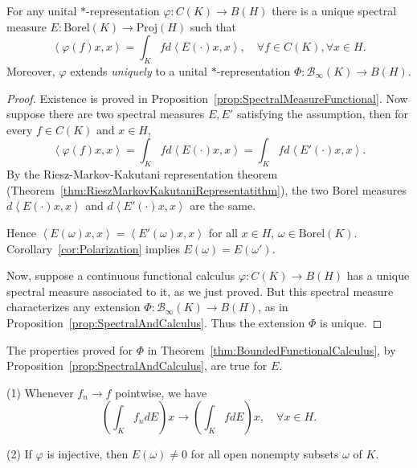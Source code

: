 \begin{theorem}
	\label{thm:SpectMeasUnique}
	For any unital $*$-representation $\varphi: C(K) \to B(H)$ there is a unique spectral measure $E: \text{Borel}(K) \to \text{Proj}(H)$ such that
	\[
		\left\langle \varphi(f)x, x \right\rangle 
		= \int _K f d\left\langle E(\cdot )x, x \right\rangle 
		, \quad \forall f \in C(K), \forall x \in H
	.\] 
	Moreover, $\varphi$ extends \textit{uniquely} to a unital  $*$-representation $\Phi: \mathcal{B}_{\infty }\left( K \right) \to B(H)$. 

\end{theorem}
\begin{proof}
	Existence is proved in Proposition~\ref{prop:SpectralMeasureFunctional}. Now suppose there are two spectral measures $E, E'$ satisfying the assumption, then for every $f \in C(K)$ and $x \in H$,
	\[
		\left\langle \varphi(f) x, x \right\rangle 
		= \int _K f d \left\langle E(\cdot )x, x \right\rangle 
		= \int _K f d\left\langle E'(\cdot )x, x \right\rangle 
	.\] 
	By the Riesz-Markov-Kakutani representation theorem (Theorem~\ref{thm:RieszMarkovKakutaniRepresentatithm}), the two Borel measures $d\left\langle E(\cdot )x, x \right\rangle $ and $d\left\langle E'(\cdot )x, x \right\rangle $ are the same.

	Hence $\left\langle E(\omega) x, x \right\rangle  = \left\langle E'(\omega) x, x \right\rangle $ for all $x \in H$, $\omega \in \text{Borel}(K)$. Corollary~\ref{cor:Polarization} implies $E(\omega) = E(\omega')$.

	Now, suppose a continuous functional calculus $\varphi: C(K) \to B(H)$ has a unique spectral measure associated to it, as we just proved. But this spectral measure characterizes any extension $\Phi: \mathcal{B}_\infty (K) \to B(H)$, as in Proposition~\ref{prop:SpectralAndCalculus}. Thus the extension $\Phi$ is unique.
\end{proof}

	The properties proved for $\Phi$ in Theorem~\ref{thm:BoundedFunctionalCalculus}, by Proposition~\ref{prop:SpectralAndCalculus}, are true for $E$.
\begin{corollary}
	\label{cor:ContSpecIntegral}
	(1) Whenever $f_n \to f$ pointwise, we have
	\[
		\left(\int _K f_n dE \right)x \to 
		\left( \int _K f dE \right) x, \quad \forall x \in H
	.\] 
	
	(2) If $\varphi$ is injective, then $E(\omega)\neq 0$ for all open nonempty subsets $\omega$ of $K$.
\end{corollary}

